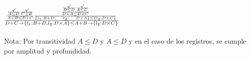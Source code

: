 \documentclass[a4paper]{article}
\begin{document}
\begin{enumerate}
\begin{enumerate}
$ \frac {
	\frac { 
		\frac { \surd }{ A\le D } 
		\frac { \surd  }{ C\le B }  }
    { A+B\le D+C } 
	\frac { \frac {\frac{\surd}{ D\leq D } \frac{\surd}{A\leq C} }{D\times A \leq D\times C} }{  \left\lbrace { l }_{ 1 }:B+D,\quad { l }_{ 2 }:\quad D\times A\right\rbrace \leq \left\lbrace { l }_{ 2 }:D\times C\right\rbrace  }}
    {D+C \rightarrow \left\lbrace l_1: B + D, l_2: D\times A \right\rbrace \leq A + B \rightarrow \left\lbrace l_2: D\times C\right\rbrace}
$
\\
\\
Nota: Por transitividad $A\leq D$ y $ A\leq D$ y en el caso de los registros, se cumple por amplitud y profundidad.


\end{enumerate}


\end{enumerate}
\end{document}
